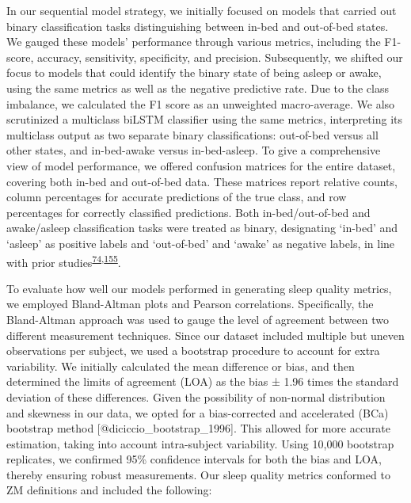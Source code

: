 \documentclass[
  10pt,
]{scrbook}
\begin{document}
In our sequential model strategy, we initially focused on models that
carried out binary classification tasks distinguishing between in-bed
and out-of-bed states. We gauged these models' performance through
various metrics, including the F1-score, accuracy, sensitivity,
specificity, and precision. Subsequently, we shifted our focus to models
that could identify the binary state of being asleep or awake, using the
same metrics as well as the negative predictive rate. Due to the class
imbalance, we calculated the F1 score as an unweighted macro-average. We
also scrutinized a multiclass biLSTM classifier using the same metrics,
interpreting its multiclass output as two separate binary
classifications: out-of-bed versus all other states, and in-bed-awake
versus in-bed-asleep. To give a comprehensive view of model performance,
we offered confusion matrices for the entire dataset, covering both
in-bed and out-of-bed data. These matrices report relative counts,
column percentages for accurate predictions of the true class, and row
percentages for correctly classified predictions. Both in-bed/out-of-bed
and awake/asleep classification tasks were treated as binary,
designating `in-bed' and `asleep' as positive labels and `out-of-bed'
and `awake' as negative labels, in line with prior
studies\textsuperscript{\protect\hyperlink{ref-hjorth_measure_2012}{74},\protect\hyperlink{ref-kushida_comparison_2001}{155}}.

To evaluate how well our models performed in generating sleep quality
metrics, we employed Bland-Altman plots and Pearson correlations.
Specifically, the Bland-Altman approach was used to gauge the level of
agreement between two different measurement techniques. Since our
dataset included multiple but uneven observations per subject, we used a
bootstrap procedure to account for extra variability. We initially
calculated the mean difference or bias, and then determined the limits
of agreement (LOA) as the bias ± 1.96 times the standard deviation of
these differences. Given the possibility of non-normal distribution and
skewness in our data, we opted for a bias-corrected and accelerated
(BCa) bootstrap method {[}@diciccio\_bootstrap\_1996{]}. This allowed
for more accurate estimation, taking into account intra-subject
variability. Using 10,000 bootstrap replicates, we confirmed 95\%
confidence intervals for both the bias and LOA, thereby ensuring robust
measurements. Our sleep quality metrics conformed to ZM definitions and
included the following:
\end{document}
